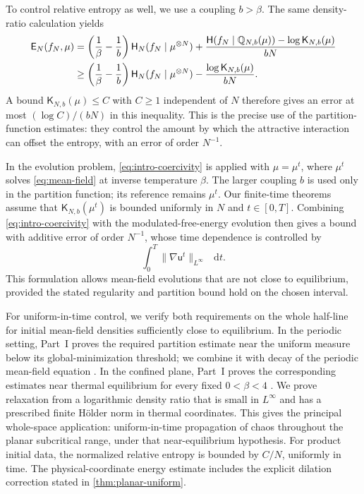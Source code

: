 \documentclass[11pt,reqno]{amsart}
\numberwithin{equation}{section}
\theoremstyle{definition}
\theoremstyle{remark}
\newcommand{\Hr}{\mathsf H}
\newcommand{\Er}{\mathsf E}
\newcommand{\K}{\mathsf K}
\newcommand{\Q}{\mathbb Q}
\renewcommand{\u}{\mathsf u}
\newcommand{\dd}{\mathop{}\!\mathrm d}
\begin{document}
To control relative entropy as well, we use a coupling $b>\beta$. The same density-ratio calculation yields
\begin{align}
 \Er_N(f_N,\mu)
 &=\left(\frac1\beta-\frac1b\right)\Hr_N(f_N\mid\mu^{\otimes N})
   +\frac{\Hr(f_N\mid\Q_{N,b}(\mu))-\log\K_{N,b}(\mu)}{bN}
   \notag\\
 &\geq\left(\frac1\beta-\frac1b\right)\Hr_N(f_N\mid\mu^{\otimes N})
   -\frac{\log\K_{N,b}(\mu)}{bN}.
 \label{eq:intro-coercivity}
\end{align}
A bound $\K_{N,b}(\mu)\leq C$ with $C\geq1$ independent of $N$ therefore gives an error at most $(\log C)/(bN)$ in this inequality. This is the precise use of the partition-function estimates: they control the amount by which the attractive interaction can offset the entropy, with an error of order $N^{-1}$.

In the evolution problem, \eqref{eq:intro-coercivity} is applied with $\mu=\mu^t$, where $\mu^t$ solves \eqref{eq:mean-field} at inverse temperature $\beta$. The larger coupling $b$ is used only in the partition function; its reference remains $\mu^t$. Our finite-time theorems assume that $\K_{N,b}(\mu^t)$ is bounded uniformly in $N$ and $t\in[0,T]$. Combining \eqref{eq:intro-coercivity} with the modulated-free-energy evolution then gives a bound with additive error of order $N^{-1}$, whose time dependence is controlled by
\begin{equation}\label{eq:intro-lipschitz-integral}
 \int_0^T\|\nabla\u^t\|_{L^\infty}\,\dd t.
\end{equation}
This formulation allows mean-field evolutions that are not close to equilibrium, provided the stated regularity and partition bound hold on the chosen interval.

For uniform-in-time control, we verify both requirements on the whole half-line for initial mean-field densities sufficiently close to equilibrium. In the periodic setting, Part~I proves the required partition estimate near the uniform measure below its global-minimization threshold; we combine it with decay of the periodic mean-field equation \cite[Propositions~4.6 and~5.8]{PartI}. In the confined plane, Part~I proves the corresponding estimates near thermal equilibrium for every fixed $0<\beta<4$ \cite[Theorem~9.1 and Appendix~G]{PartI}. We prove relaxation from a logarithmic density ratio that is small in $L^\infty$ and has a prescribed finite H\"older norm in thermal coordinates. This gives the principal whole-space application: uniform-in-time propagation of chaos throughout the planar subcritical range, under that near-equilibrium hypothesis. For product initial data, the normalized relative entropy is bounded by $C/N$, uniformly in time. The physical-coordinate energy estimate includes the explicit dilation correction stated in \cref{thm:planar-uniform}.
\end{document}
